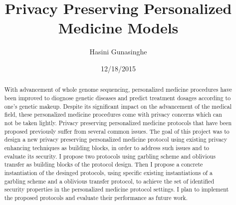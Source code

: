 \documentclass[10pt,letterpaper]{article}
\title{Privacy Preserving Personalized Medicine Models}
\author{Hasini Gunasinghe}
\date{12/18/2015}
\begin{document}
\maketitle

\begin{abstract}
With advancement of whole genome sequencing, personalized medicine procedures have been improved to diognose genetic diseases and predict treatment dosages 
according to one's genetic makeup. Despite its significant impact on the advancement of the medical field, these personalized medicine procedures come 
with privacy concerns which can not be taken lightly. Privacy preserving personalized medicine protocols that have been proposed previously suffer from
several common issues. The goal of this project was to design a new privacy preserving personalized medicine protocol using existing privacy enhancing 
techniques as building blocks, in order to address such issues and to evaluate its security. I propose two protocols using garbling scheme and oblivious 
transfer as building blocks of the protocol design. Then I propose a concrete instantiation of the desinged protocols, using specific existing instantiations 
of a garbling scheme and a oblivious transfer protocol, to achieve the set of identified security properties in the personalized medicine protocol 
settings. I plan to implement the proposed protocols and evaluate their performance as future work.
\end{abstract}
\end{document}
